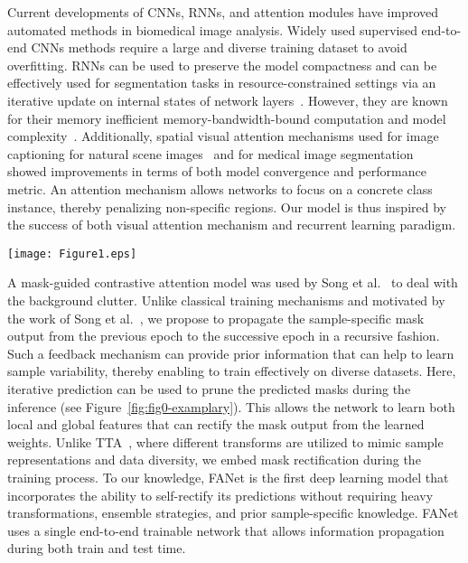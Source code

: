\documentclass[journal]{IEEEtran}
\begin{document}
Current developments of \acp{CNN}, \acp{RNN}, and attention modules have improved automated methods in biomedical image analysis. Widely used supervised end-to-end \acp{CNN} methods require a large and diverse training dataset to avoid overfitting. \acp{RNN} can be used to preserve the model compactness and can be effectively used for segmentation tasks in resource-constrained settings via an iterative update on internal states of network layers~\cite{Wang:ICCV2019}. However, they are known for their memory inefficient memory-bandwidth-bound computation and model complexity~\cite{bai2018empirical}. Additionally, spatial visual attention mechanisms used for image captioning for natural scene images~\cite{xu2015show} and for medical image segmentation~\cite{oktay2018attention} showed improvements in terms of both model convergence and performance metric. An attention mechanism allows networks to focus on a concrete class instance, thereby penalizing non-specific regions. Our model is thus inspired by the success of both visual attention mechanism and recurrent learning paradigm. 

\begin{figure*}[t!]
    \centering
    \texttt{[image: Figure1.eps]}
    \caption{Semantic segmentation using our FANet architecture. Otsu thresholding is used for generating the initial mask used during  iteration. Then the predictions are iteratively updated with the predicted mask. It can be observed that already at the 2 iteration, the results converge. The corresponding feature maps before and after feedback attention at the last decoder layer of our FANet are shown as color images on the right.}\label{fig:fig0-examplary}
\end{figure*}

{A} mask-guided contrastive attention model was used by Song et al.~\cite{Song_2018_CVPR} to deal with the background clutter. Unlike classical training mechanisms and motivated by the work of Song et al.~\cite{Song_2018_CVPR}, we propose to propagate the sample-specific mask output from the previous epoch to the successive epoch in a recursive fashion. Such a feedback mechanism can provide prior information that can help to learn {sample} variability, thereby enabling to train effectively on diverse datasets. Here, iterative prediction can be used to prune the predicted masks during the inference (see Figure~\ref{fig:fig0-examplary}). This allows {the network to learn both local and global features that can} rectify the mask output from the {learned} weights. Unlike \ac{TTA}~\cite{WANG201934}, where different transforms are utilized to mimic sample representations {and data diversity, we embed mask rectification during the training process}. To our knowledge, \ac{FANet} is the first deep learning model that {incorporates the ability to} self-rectify its predictions without requiring {heavy} transformations, ensemble strategies, and prior sample-specific knowledge. {FANet uses a} single end-to-end trainable network that allows information propagation during both train and test time.
\end{document}
